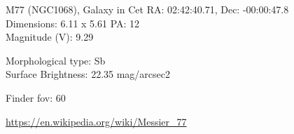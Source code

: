 \begin{block}{M77 (NGC1068), Galaxy in Cet}
    RA: 02:42:40.71, Dec: -00:00:47.8 \\ 
    Dimensions: 6.11 x 5.61 PA: 12 \\ 
    Magnitude (V): 9.29

    Morphological type: Sb \\ 
    Surface Brightness: 22.35 mag/arcsec2 


    Finder fov: 60 

    \url{https://en.wikipedia.org/wiki/Messier_77} 
\end{block}